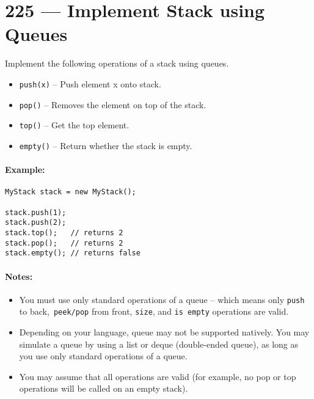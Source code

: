 \section{225 --- Implement Stack using Queues}
Implement the following operations of a stack using queues.

\begin{itemize}
\item \texttt{push(x)} -- Push element x onto stack.
\item \texttt{pop()} -- Removes the element on top of the stack.
\item \texttt{top()} -- Get the top element.
\item \texttt{empty()} -- Return whether the stack is empty.
\end{itemize}
\paragraph{Example:}
\begin{lstlisting}[style=customc]
MyStack stack = new MyStack();

stack.push(1);
stack.push(2);  
stack.top();   // returns 2
stack.pop();   // returns 2
stack.empty(); // returns false
\end{lstlisting}

\paragraph{Notes:}

\begin{itemize}
\item You must use only standard operations of a queue -- which means only \texttt{push} to back,\texttt{ peek/pop} from front, \texttt{size}, and \texttt{is empty} operations are valid.
\item Depending on your language, queue may not be supported natively. You may simulate a queue by using a list or deque (double-ended queue), as long as you use only standard operations of a queue.
\item You may assume that all operations are valid (for example, no pop or top operations will be called on an empty stack).
\end{itemize}
